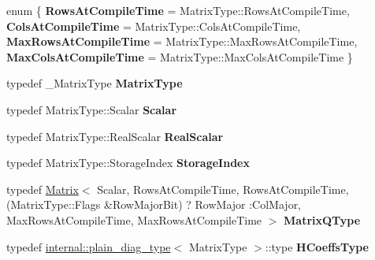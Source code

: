 \begin{DoxyCompactItemize}
\item 
\mbox{\label{class_eigen_1_1_householder_q_r_a2014eb08b29ab6c51b255d50e4a40499}} 
enum \{ {\bfseries Rows\+At\+Compile\+Time} = Matrix\+Type\+::Rows\+At\+Compile\+Time, 
{\bfseries Cols\+At\+Compile\+Time} = Matrix\+Type\+::Cols\+At\+Compile\+Time, 
{\bfseries Max\+Rows\+At\+Compile\+Time} = Matrix\+Type\+::Max\+Rows\+At\+Compile\+Time, 
{\bfseries Max\+Cols\+At\+Compile\+Time} = Matrix\+Type\+::Max\+Cols\+At\+Compile\+Time
 \}
\item 
\mbox{\label{class_eigen_1_1_householder_q_r_a134120663d098b19d0850c8b8277f0bf}} 
typedef \+\_\+\+Matrix\+Type {\bfseries Matrix\+Type}
\item 
\mbox{\label{class_eigen_1_1_householder_q_r_a5dce09a1ce29ead94f3eae883ee2eaa0}} 
typedef Matrix\+Type\+::\+Scalar {\bfseries Scalar}
\item 
\mbox{\label{class_eigen_1_1_householder_q_r_a153982d3df67aedc48bfe046d6677a69}} 
typedef Matrix\+Type\+::\+Real\+Scalar {\bfseries Real\+Scalar}
\item 
\mbox{\label{class_eigen_1_1_householder_q_r_a099bd13f10d30af75c88657096870343}} 
typedef Matrix\+Type\+::\+Storage\+Index {\bfseries Storage\+Index}
\item 
\mbox{\label{class_eigen_1_1_householder_q_r_a6f384954ee6154168ee979d23f43930a}} 
typedef \mbox{\hyperlink{class_eigen_1_1_matrix}{Matrix}}$<$ Scalar, Rows\+At\+Compile\+Time, Rows\+At\+Compile\+Time,(Matrix\+Type\+::\+Flags \&Row\+Major\+Bit) ? Row\+Major \+:Col\+Major, Max\+Rows\+At\+Compile\+Time, Max\+Rows\+At\+Compile\+Time $>$ {\bfseries Matrix\+Q\+Type}
\item 
\mbox{\label{class_eigen_1_1_householder_q_r_a9262c3ac9ce88401189952feffeedade}} 
typedef \mbox{\hyperlink{struct_eigen_1_1internal_1_1plain__diag__type}{internal\+::plain\+\_\+diag\+\_\+type}}$<$ Matrix\+Type $>$\+::type {\bfseries H\+Coeffs\+Type}
\item 

\end{DoxyCompactItemize}
